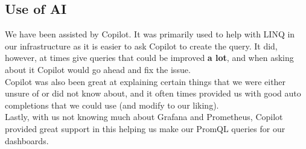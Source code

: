 \subsection{Use of AI}
We have been assisted by Copilot. It was primarily used to help with LINQ in our infrastructure as it is easier to ask Copilot to create the query. It did, however, at times give queries that could be improved \textbf{a lot}, and when asking about it Copilot would go ahead and fix the issue. \\

Copilot was also been great at explaining certain things that we were either unsure of or did not know about, and it often times provided us with good auto completions that we could use (and modify to our liking). \\

Lastly, with us not knowing much about Grafana and Prometheus, Copilot provided great support in this helping us make our PromQL queries for our dashboards.